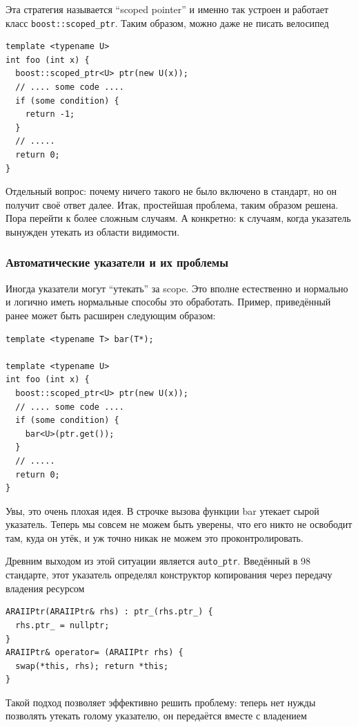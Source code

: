 \documentclass[a4paper,12pt,oneside]{article}
\begin{document}
Эта стратегия называется ``scoped pointer'' и именно так устроен и работает класс \lstinline!boost::scoped_ptr!. Таким образом, можно даже не писать велосипед

\begin{lstlisting}
template <typename U>
int foo (int x) {
  boost::scoped_ptr<U> ptr(new U(x));
  // .... some code ....
  if (some condition) {
    return -1;
  }
  // .....
  return 0;
}
\end{lstlisting}

Отдельный вопрос: почему ничего такого не было включено в стандарт, но он получит своё ответ далее. Итак, простейшая проблема, таким образом решена. Пора перейти к более сложным случаям. А конкретно: к случаям, когда указатель вынужден утекать из области видимости.

\subsubsection{Автоматические указатели и их проблемы}\label{COAP}

Иногда указатели могут ``утекать'' за scope. Это вполне естественно и нормально и логично иметь нормальные способы это обработать. Пример, приведённый ранее может быть расширен следующим образом:

\begin{lstlisting}
template <typename T> bar(T*);

template <typename U>
int foo (int x) {
  boost::scoped_ptr<U> ptr(new U(x));
  // .... some code ....
  if (some condition) {
    bar<U>(ptr.get());
  }
  // .....
  return 0;
}
\end{lstlisting}

Увы, это очень плохая идея. В строчке вызова функции bar утекает сырой указатель. Теперь мы совсем не можем быть уверены, что его никто не освободит там, куда он утёк, и уж точно никак не можем это проконтролировать.

Древним выходом из этой ситуации является \lstinline!auto_ptr!. Введённый в 98 стандарте, этот указатель определял конструктор копирования через передачу владения ресурсом

\begin{lstlisting}
ARAIIPtr(ARAIIPtr& rhs) : ptr_(rhs.ptr_) { 
  rhs.ptr_ = nullptr; 
}
ARAIIPtr& operator= (ARAIIPtr rhs) { 
  swap(*this, rhs); return *this; 
}
\end{lstlisting}

Такой подход позволяет эффективно решить проблему: теперь нет нужды позволять утекать голому указателю, он передаётся вместе с владением
\end{document}
